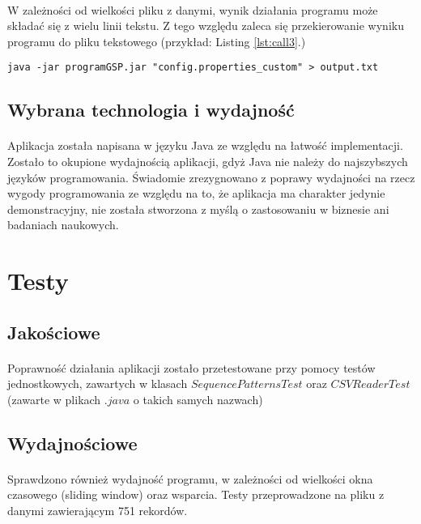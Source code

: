 \documentclass[11pt,a4paper]{article}
\begin{document}
\paragraph{} W zależności od wielkości pliku z danymi, wynik działania programu może składać się z wielu linii tekstu. Z tego względu zaleca się przekierowanie wyniku programu do pliku tekstowego (przykład: Listing \ref{lst:call3}.)
\begin{lstlisting}[caption={Wywołanie dla domyślnego pliku konfiguracyjnego},label={lst:call3}]
java -jar programGSP.jar "config.properties_custom" > output.txt
\end{lstlisting}
\subsection{Wybrana technologia i wydajność}
\paragraph{} Aplikacja została napisana w języku Java ze względu na łatwość implementacji. Zostało to okupione wydajnością aplikacji, gdyż Java nie należy do najszybszych języków programowania. Świadomie zrezygnowano z poprawy wydajności na rzecz wygody programowania ze względu na to, że aplikacja ma charakter jedynie demonstracyjny, nie została stworzona z myślą o zastosowaniu w biznesie ani badaniach naukowych.

\section{Testy}
\subsection{Jakościowe}
\paragraph{} Poprawność działania aplikacji zostało przetestowane przy pomocy testów jednostkowych, zawartych w klasach $SequencePatternsTest$ oraz $CSVReaderTest$ (zawarte w plikach $.java$ o takich samych nazwach)
\subsection{Wydajnościowe}
\paragraph{} Sprawdzono również wydajność programu, w zależności od wielkości okna czasowego (sliding window) oraz wsparcia. Testy przeprowadzone na pliku z danymi zawierającym 751 rekordów.
\end{document}
